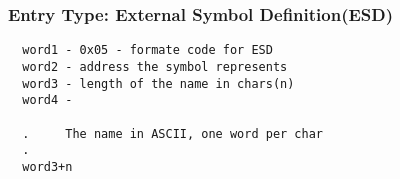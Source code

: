 \documentclass[11pt]{amsart}
\begin{document}
\subsubsection{Entry Type: External Symbol Definition(ESD)}
\begin{verbatim}
  word1 - 0x05 - formate code for ESD
  word2 - address the symbol represents
  word3 - length of the name in chars(n)
  word4 -

  .     The name in ASCII, one word per char
  .
  word3+n
\end{verbatim}
\end{document}
